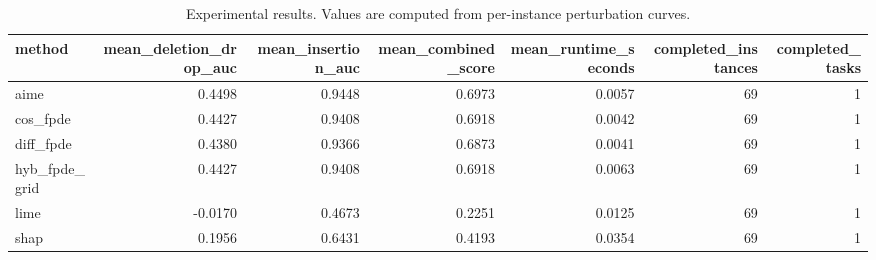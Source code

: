 \begin{table}[t]
\caption{Experimental results. Values are computed from per-instance perturbation curves.}
\label{tab:main_results_computed}
\centering
\begin{tabular}{lrrrrrr}
\toprule
method & mean\_deletion\_drop\_auc & mean\_insertion\_auc & mean\_combined\_score & mean\_runtime\_seconds & completed\_instances & completed\_tasks \\
\midrule
aime & 0.4498 & 0.9448 & 0.6973 & 0.0057 & 69 & 1 \\
cos\_fpde & 0.4427 & 0.9408 & 0.6918 & 0.0042 & 69 & 1 \\
diff\_fpde & 0.4380 & 0.9366 & 0.6873 & 0.0041 & 69 & 1 \\
hyb\_fpde\_grid & 0.4427 & 0.9408 & 0.6918 & 0.0063 & 69 & 1 \\
lime & -0.0170 & 0.4673 & 0.2251 & 0.0125 & 69 & 1 \\
shap & 0.1956 & 0.6431 & 0.4193 & 0.0354 & 69 & 1 \\
\bottomrule
\end{tabular}

\end{table}
